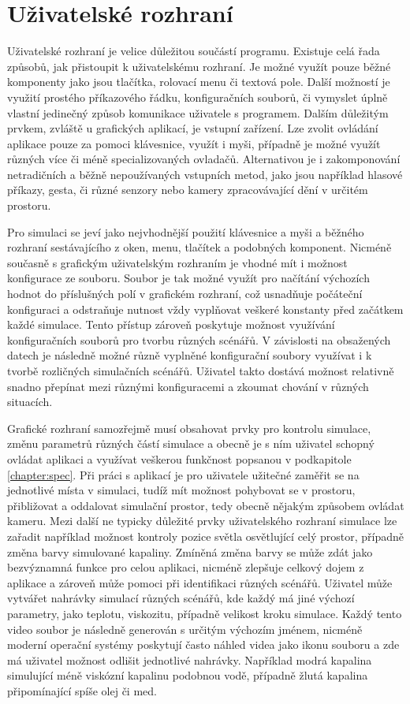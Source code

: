\section{Uživatelské rozhraní}
Uživatelské rozhraní je velice důležitou součástí programu. Existuje celá řada způsobů, jak přistoupit k uživatelskému rozhraní. Je možné využít pouze běžné komponenty jako jsou tlačítka, rolovací menu či textová pole. Další možností je využití prostého příkazového řádku, konfiguračních souborů, či vymyslet úplně vlastní jedinečný způsob komunikace uživatele s programem. Dalším důležitým prvkem, zvláště u grafických aplikací, je vstupní zařízení. Lze zvolit ovládání aplikace pouze za pomoci klávesnice, využít i myši, případně je možné využít různých více či méně specializovaných ovladačů. Alternativou je i zakomponování netradičních a běžně nepoužívaných vstupních metod, jako jsou například hlasové příkazy, gesta, či různé senzory nebo kamery zpracovávající dění v určitém prostoru.

Pro simulaci se jeví jako nejvhodnější použití klávesnice a myši a běžného rozhraní sestávajícího z oken, menu, tlačítek a podobných komponent. Nicméně současně s grafickým uživatelským rozhraním je vhodné mít i možnost konfigurace ze souboru. Soubor je tak možné využít pro načítání výchozích hodnot do příslušných polí v grafickém rozhraní, což usnadňuje počáteční konfiguraci a odstraňuje nutnost vždy vyplňovat veškeré konstanty před začátkem každé simulace. Tento přístup zároveň poskytuje možnost využívání konfiguračních souborů pro tvorbu různých scénářů. V závislosti na obsažených datech je následně možné různě vyplněné konfigurační soubory využívat i k tvorbě rozličných simulačních scénářů. Uživatel takto dostává možnost relativně snadno přepínat mezi různými konfiguracemi a zkoumat chování v různých situacích.

Grafické rozhraní samozřejmě musí obsahovat prvky pro kontrolu simulace, změnu parametrů různých částí simulace a obecně je s ním uživatel schopný ovládat aplikaci a využívat veškerou funkčnost popsanou v podkapitole \ref{chapter:spec}. Při práci s aplikací je pro uživatele užitečné zaměřit se na jednotlivé místa v simulaci, tudíž mít možnost pohybovat se v prostoru, přibližovat a oddalovat simulační prostor, tedy obecně nějakým způsobem ovládat kameru. Mezi další ne typicky důležité prvky uživatelského rozhraní simulace lze zařadit například možnost kontroly pozice světla osvětlující celý prostor, případně změna barvy simulované kapaliny. Zmíněná změna barvy se může zdát jako bezvýznamná funkce pro celou aplikaci, nicméně zlepšuje celkový dojem z aplikace a zároveň může pomoci při identifikaci různých scénářů. Uživatel může vytvářet nahrávky simulací různých scénářů, kde každý má jiné výchozí parametry, jako teplotu, viskozitu, případně velikost kroku simulace. Každý tento video soubor je následně generován s určitým výchozím jménem, nicméně moderní operační systémy poskytují často náhled videa jako ikonu souboru a zde má uživatel možnost odlišit jednotlivé nahrávky. Například modrá kapalina simulující méně viskózní kapalinu podobnou vodě, případně žlutá kapalina připomínající spíše olej či med.


